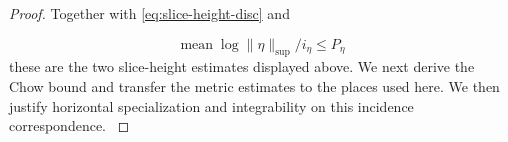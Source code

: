 \begin{proof}
Together with \eqref{eq:slice-height-disc} and

\[
  \operatorname{mean}\log\|\eta\|_{\sup}/i_\eta\le P_\eta
\]
these are the two slice-height estimates displayed above.
We next derive the Chow bound and transfer the metric estimates
to the places used here. We then justify horizontal specialization and
integrability on this incidence correspondence.
\label{cor:slice-heights-3}
\end{proof}
